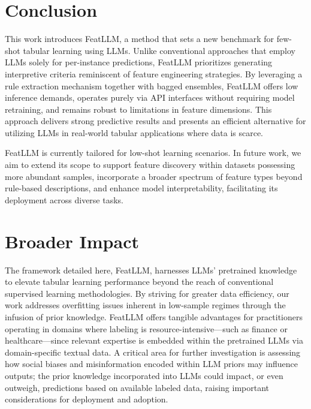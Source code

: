 \section{Conclusion}
This work introduces \textsf{FeatLLM}, a method that sets a new benchmark for few-shot tabular learning using LLMs. Unlike conventional approaches that employ LLMs solely for per-instance predictions, \textsf{FeatLLM} prioritizes generating interpretive criteria reminiscent of feature engineering strategies. By leveraging a rule extraction mechanism together with bagged ensembles, \textsf{FeatLLM} offers low inference demands, operates purely via API interfaces without requiring model retraining, and remains robust to limitations in feature dimensions. This approach delivers strong predictive results and presents an efficient alternative for utilizing LLMs in real-world tabular applications where data is scarce.

\textsf{FeatLLM} is currently tailored for low-shot learning scenarios. In future work, we aim to extend its scope to support feature discovery within datasets possessing more abundant samples, incorporate a broader spectrum of feature types beyond rule-based descriptions, and enhance model interpretability, facilitating its deployment across diverse tasks.

\section{Broader Impact}
The framework detailed here, \textsf{FeatLLM}, harnesses LLMs’ pretrained knowledge to elevate tabular learning performance beyond the reach of conventional supervised learning methodologies. By striving for greater data efficiency, our work addresses overfitting issues inherent in low-sample regimes through the infusion of prior knowledge. \textsf{FeatLLM} offers tangible advantages for practitioners operating in domains where labeling is resource-intensive—such as finance or healthcare—since relevant expertise is embedded within the pretrained LLMs via domain-specific textual data. A critical area for further investigation is assessing how social biases and misinformation encoded within LLM priors may influence outputs; the prior knowledge incorporated into LLMs could impact, or even outweigh, predictions based on available labeled data, raising important considerations for deployment and adoption.

